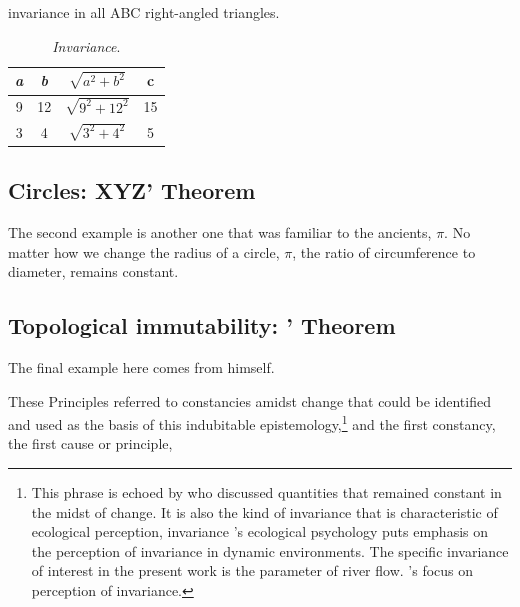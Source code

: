 \documentclass[a4paper, 12pt]{article}
\begin{document}
invariance in all ABC right-angled triangles.

\begin{table}[h!]
    \small 
    \centering
    \begin{tabular}{cccc} 
        \textit{a} & \textit{b} & \(\sqrt{a^2 + b^2}\) & c \\
        \hline
        9 & 12 & \(\sqrt{9^2 + 12^2}\) & 15 \\	
        3 & 4 & \(\sqrt{3^2 + 4^2}\) & 5 \\	
        
        \hline
    \end{tabular}
    \caption{\textit{Invariance}.}
    \label{tab:algebraic}
\end{table}


\subsection{Circles: XYZ' Theorem}
\label{subsec:circle}

The second example is another one that was familiar to the ancients, \(\pi\). No matter how we change the radius of a circle, \(\pi\), the ratio of circumference to diameter, remains constant.



\subsection{Topological immutability: \citeauthor{descartes_principles_1982}' Theorem}
\label{subsec:topological:immutability}

The final example here comes from \citeauthor{descartes_principles_1982} himself. 

These Principles referred to constancies amidst change that could be identified and used as the basis of this indubitable epistemology,\footnote{
This phrase is echoed by \citeauthor{lindsay_energy_1975} \citeyearpar[p.5]{lindsay_energy_1975} who discussed quantities that remained constant in the midst of change. It is also the kind of invariance that is characteristic of \citeauthor{gibson_ecological_1986} ecological perception, invariance \citeauthor{gibson_ecological_1986}'s ecological psychology puts emphasis on the perception of invariance in dynamic environments. The specific invariance of interest in the present work is the parameter of river flow. \citeauthor{gibson_ecological_1986}'s focus on perception of invariance.} and the first constancy, the first cause or principle, 
\end{document}
